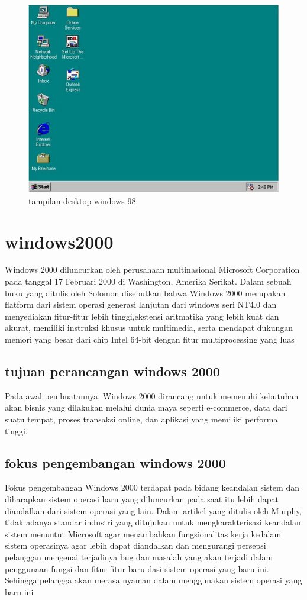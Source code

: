 		\begin{figure}[ht]
		\centerline{\includegraphics[wiedth=1\textwidth]{figures/Desktopwindows98.JPG}}
		\caption{tampilan desktop windows 98}
		\label{Desktopwindows98}
		\end{figure}

\section{windows2000}
	Windows 2000 diluncurkan oleh perusahaan multinasional Microsoft Corporation pada tanggal 17 Februari 2000 di Washington, Amerika Serikat. 
	Dalam sebuah buku yang ditulis oleh Solomon disebutkan bahwa Windows 2000 merupakan flatform dari sistem operasi generasi lanjutan dari windows seri NT4.0 dan menyediakan fitur-fitur lebih tinggi,ekstensi aritmatika yang lebih kuat dan akurat, memiliki instruksi khusus untuk multimedia, serta mendapat dukungan memori yang besar dari chip Intel 64-bit dengan fitur multiprocessing yang luas \cite{solomon2000inside}
	\subsection{tujuan perancangan windows 2000}
		Pada awal pembuatannya, Windows 2000 dirancang untuk memenuhi kebutuhan akan bisnis yang dilakukan melalui dunia maya seperti e-commerce, data dari suatu tempat, proses transaksi online, dan aplikasi yang memiliki performa tinggi.
	\subsection{fokus pengembangan windows 2000}
		Fokus pengembangan Windows 2000 terdapat pada bidang keandalan sistem dan diharapkan sistem operasi baru yang diluncurkan pada saat itu lebih dapat diandalkan dari sistem operasi yang lain.
		Dalam artikel yang ditulis oleh Murphy, tidak adanya standar industri yang ditujukan untuk mengkarakterisasi keandalan sistem menuntut Microsoft agar menambahkan fungsionalitas kerja kedalam sistem operasinya agar lebih dapat diandalkan dan mengurangi persepsi pelanggan mengenai terjadinya bug dan masalah yang akan terjadi dalam penggunaan fungsi dan fitur-fitur baru dasi sistem operasi yang baru ini. Sehingga pelangga akan merasa nyaman dalam menggunakan sistem operasi yang baru ini \cite{murphy2000windows} 

